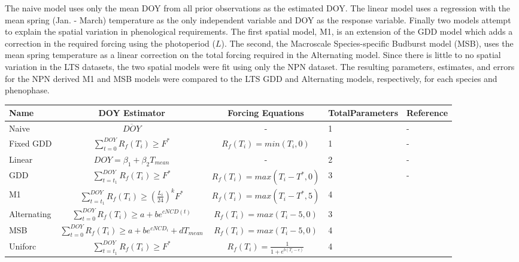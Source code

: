 \documentclass[fleqn,10pt,lineno]{wlpeerj} %
\begin{document}
The naive model uses only the mean DOY from all prior observations as the estimated DOY. The linear model uses a regression with the mean spring (Jan. - March) temperature as the only independent variable and DOY as the response variable. Finally two models attempt to explain the spatial variation in phenological requirements. The first spatial model, M1, is an extension of the GDD model which adds a correction in the required forcing using the photoperiod ($L$). The second, the Macroscale Species-specific Budburst model (MSB), uses the mean spring temperature as a linear correction on the total forcing required in the Alternating model. Since there is little to no spatial variation in the LTS datasets, the two spatial models were fit using only the NPN dataset. The resulting parameters, estimates, and errors for the NPN derived M1 and MSB models were compared to the LTS GDD and Alternating models, respectively, for each species and phenophase.  

\begin{center}
{\def\arraystretch{2}\tabcolsep=5pt
    \begin{tabular}{ | l | c | c | p{1.3cm} | l |}
    \hline
    Name & DOY Estimator & Forcing Equations & Total\newline Parameters & Reference \\ \hline
    Naive & \( \overline{DOY} \) & - & 1 & - \\
    Fixed GDD &$\sum_{t=0}^{DOY}R_{f}(T_{i})\geq F^{*} $  & $R_{f}(T_{i}) = min(T_{i}, 0)$ & 1 & - \\
    Linear & \( DOY = \beta_{1} + \beta_{2}T_{mean} \) & - & 2 & - \\
    GDD & $\sum_{t=t_{1}}^{DOY}R_{f}(T_{i})\geq F^{*} $ & $ R_{f}(T_{i}) = max(T_{i} - T^{*}, 0) $  & 3 & - \\
    M1 & $\sum_{t=t_{1}}^{DOY}R_{f}(T_{i})\geq (\frac{L_{i}}{24})^{k} F^{*} $ & $ R_{f}(T_{i}) = max(T_{i}-T^{*}, 5) $  & 4 & \citep{blumel2012} \\
    Alternating & $\sum_{t=0}^{DOY}R_{f}(T_{i})\geq a + be^{cNCD(t)} $ & $R_{f}(T_{i}) = max(T_{i}-5, 0) $ & 3 & \citep{cannell1983} \\
    MSB & $\sum_{t=0}^{DOY}R_{f}(T_{i})\geq a + be^{cNCD_{i}} +dT_{mean} $ & $R_{f}(T_{i}) = max(T_{i}-5, 0) $ & 4 & \citep{jeong2013} \\
    Uniforc &  $\sum_{t=t_{1}}^{DOY}R_{f}(T_{i})\geq F^{*} $ & $ R_{f}(T_{i}) = \frac{1}{1 + e^{b(T_{i}-c)}} $ & 4 & \citep{chuine2000} \\

    \hline
    \end{tabular}
    }
\end{center}
\end{document}
